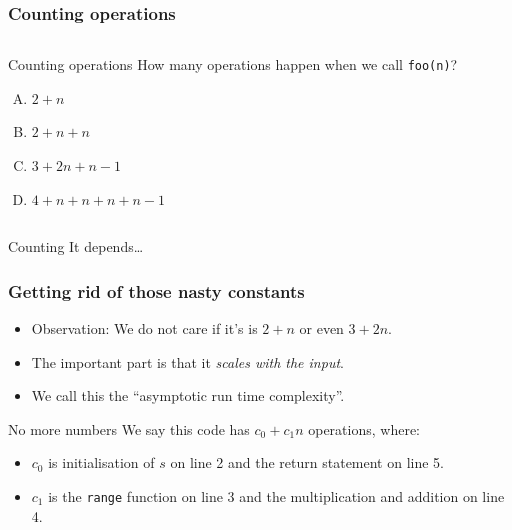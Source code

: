 \begin{frame}
	\frametitle{Counting operations}
	\begin{columns}
			
		\pause
		\begin{questionblock}{Counting operations}
			How many operations happen when we call \texttt{foo(n)}?
			\begin{enumerate}[A.]
				\item $2 + n$
				\item $2 + n + n$
				\item $3 + 2n + n-1$
				\item $4 + n + n + n + n-1$
			\end{enumerate}
		\end{questionblock}
	\end{columns}
	\pause
	\begin{answerblock}{Counting}
		It depends\dots
	\end{answerblock}
\end{frame}

\begin{frame}
	\frametitle{Getting rid of those nasty constants}

	\begin{itemize}
		\item Observation: We do not care if it's is $2+n$ or even $3+2n$.
		\item The important part is that it \textit{scales with the input}.
			\pause
		\item We call this the ``asymptotic run time complexity''.
	\end{itemize}
	\pause
	

	\begin{answerblock}{No more numbers}
		We say this code has $c_0 + c_1n$ operations, where:
		\begin{itemize}
			\item $c_0$ is initialisation of $s$ on line 2 and the return statement on line 5.
			\item $c_1$ is the \texttt{range} function on line 3 and the multiplication and addition on line 4.
		\end{itemize}
	\end{answerblock}
\end{frame}

